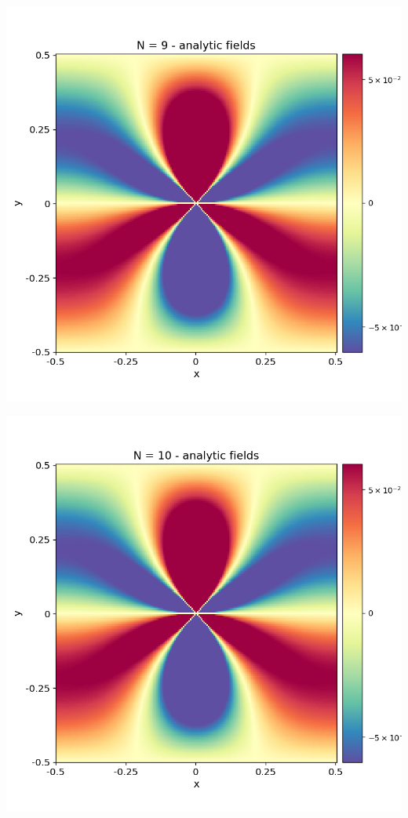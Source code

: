 \documentclass[12pt,a4paper]{article}
\theoremstyle{plain}
\begin{document}
\begin{minipage}{0.24\textwidth}
	\centering
	\includegraphics[width=\textwidth]{../stress_field_09.png}
\end{minipage}
\begin{minipage}{0.24\textwidth}
	\centering
	\includegraphics[width=\textwidth]{../stress_field_10.png}
\end{minipage}	
\end{document}
